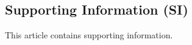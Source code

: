 \documentclass[9pt,twocolumn,twoside,lineno]{pnas-new}
\begin{document}
 \showmatmethods{} %

\showacknow{} %

\subsection*{Supporting Information (SI)}
This article contains supporting information.
% 
% 
% 
% 
% 
% 
\end{document}
